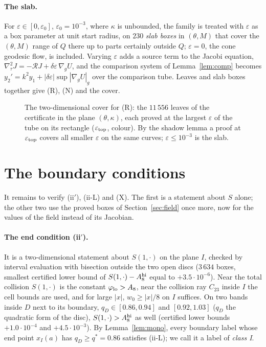 \documentclass[11pt]{article}
\theoremstyle{definition}
\begin{document}
\paragraph{The slab.} For $\varepsilon\in[0,\varepsilon_0]$, $\varepsilon_0=10^{-3}$, where $\kappa$ is unbounded, the
family is treated with $\varepsilon$ as a box parameter at unit start radius, on $230$ \emph{slab boxes} in $(\theta,M)$
that cover the $(\theta,M)$ range of $Q$ there up to parts certainly outside $Q$; $\varepsilon=0$, the cone geodesic
flow, is included. Varying $\varepsilon$ adds a source term to the Jacobi equation,
$\nabla_\tau^2J=-\mathcal RJ+\delta\varepsilon\,\nabla_gU$, and the comparison system of Lemma~\ref{lem:comp} becomes
$y_2'=k^2y_1+|\delta\varepsilon|\sup|\nabla_gU|_g$ over the comparison tube. Leaves and slab boxes together give (R),
(N) and the cover.

\begin{figure}[t]\centering
\figcover
\caption{The two-dimensional cover for (R): the $11\,556$ leaves of the certificate in the plane $(\theta,\kappa)$, each
proved at the largest $\varepsilon$ of the tube on its rectangle ($\varepsilon_{\rm top}$, colour). By the shadow lemma a
proof at $\varepsilon_{\rm top}$ covers all smaller $\varepsilon$ on the same curves; $\varepsilon\le10^{-3}$ is the slab.}
\label{fig:cover}
\end{figure}

\section{The boundary conditions}\label{sec:boundary}
It remains to verify (ii$'$), (ii-L) and (X). The first is a statement about $S$ alone; the other two use the proved
boxes of Section~\ref{sec:field} once more, now for the values of the field instead of its Jacobian.

\paragraph{The end condition (ii$'$).} It is a two-dimensional statement about $S(1,\cdot)$ on the plane $I$, checked
by interval evaluation with bisection outside the two open discs ($3\,634$ boxes, smallest certified lower bound of
$S(1,\cdot)-A_8^{\rm hi}$ equal to $+3.5\cdot10^{-6}$). Near the total collision $S(1,\cdot)$ is the constant
$\varphi_{\rm lo}>A_8$, near the collision ray $C_{23}$ inside $I$ the cell bounds are used, and for large $|x|$,
$w_0\ge|x|/8$ on $I$ suffices. On two bands inside $D$ next to its boundary, $q_D\in[0.86,0.94]$ and $[0.92,1.03]$
($q_D$ the quadratic form of the disc), $S(1,\cdot)>A_8^{\rm hi}$ as well (certified lower bounds $+1.0\cdot10^{-4}$ and
$+4.5\cdot10^{-3}$). By Lemma~\ref{lem:mono}, every boundary label whose end point $x_I(a)$ has $q_D\ge q^*=0.86$
satisfies (ii-L); we call it a label of \emph{class I}.
\end{document}
